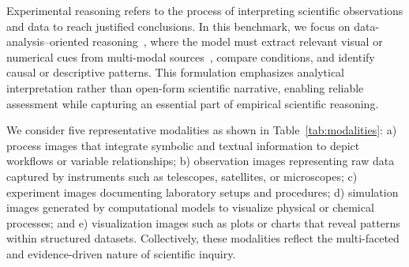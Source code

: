 Experimental reasoning refers to the process of interpreting scientific observations and data to reach justified conclusions. In this benchmark, we focus on data-analysis–oriented reasoning~\cite{zhou2025scientistsexamprobingcognitive}, where the model must extract relevant visual or numerical cues from multi-modal sources~\cite{zhang2024cmmmuchinesemassivemultidiscipline}, compare conditions, and identify causal or descriptive patterns. This formulation emphasizes analytical interpretation rather than open-form scientific narrative, enabling reliable assessment while capturing an essential part of empirical scientific reasoning.

We consider five representative modalities as shown in Table~\ref{tab:modalities}: a) process images that integrate symbolic and textual information to depict workflows or variable relationships; b) observation images representing raw data captured by instruments such as telescopes, satellites, or microscopes; c) experiment images documenting laboratory setups and procedures; d) simulation images generated by computational models to visualize physical or chemical processes; and e) visualization images such as plots or charts that reveal patterns within structured datasets. Collectively, these modalities reflect the multi-faceted and evidence-driven nature of scientific inquiry.

\begin{table}[ht]
\centering
\caption{\textbf{Experimental Reasoning Modalities}: Five visual modalities used for multi-modal evidence and analysis.}
\label{tab:modalities}
\end{table}

